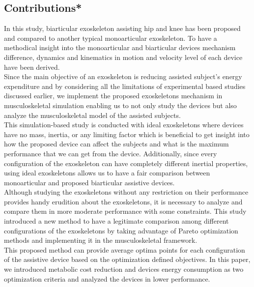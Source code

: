 \documentclass[10pt,letterpaper]{article}
\begin{document}
\subsection*{Contributions*}
In this study, biarticular exoskeleton assisting hip and knee has been proposed and compared to another typical monoarticular exoskeleton. To have a methodical insight into the monoarticular and biarticular devices mechanism difference, dynamics and kinematics in motion and velocity level of each device have been derived.\\
Since the main objective of an exoskeleton is reducing assisted subject's energy expenditure and by considering all the limitations of experimental based studies discussed earlier, we implement the proposed exoskeletons mechanism in musculoskeletal simulation enabling us to not only study the devices but also analyze the musculoskeletal model of the assisted subjects.\\
This simulation-based study is conducted with ideal exoskeletons where devices have no mass, inertia, or any limiting factor which is beneficial to get insight into how the proposed device can affect the subjects and what is the maximum performance that we can get from the device. Additionally, since every configuration of the exoskeleton can have completely different inertial properties, using ideal exoskeletons allows us to have a fair comparison between monoarticular and proposed biarticular assistive devices.\\
Although studying the exoskeletons without any restriction on their performance provides handy erudition about the exoskeletons, it is necessary to analyze and compare them in more moderate performance with some constraints. This study introduced a new method to have a legitimate comparison among different configurations of the exoskeletons by taking advantage of Pareto optimization methods and implementing it in the musculoskeletal framework.\\
This proposed method can provide average optima points for each configuration of the assistive device based on the optimization defined objectives. In this paper, we introduced metabolic cost reduction and devices energy consumption as two optimization criteria and analyzed the devices in lower performance.\\
\end{document}
